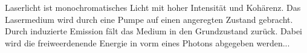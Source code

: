 Laserlicht ist monochromatisches Licht mit hoher Intensität und Kohärenz.
Das Lasermedium wird durch eine Pumpe auf einen angeregten Zustand gebracht.
Durch induzierte Emission fält das Medium in den Grundzustand zurück.
Dabei wird die freiweerdenende Energie in vorm eines Photons abgegeben werden...
